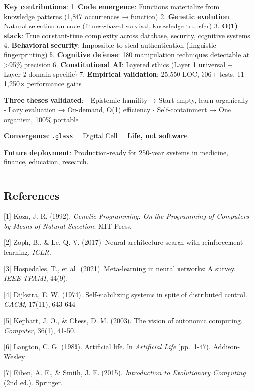 \documentclass[
]{article}
\begin{document}
\textbf{Key contributions}: 1. \textbf{Code emergence}: Functions
materialize from knowledge patterns (1,847 occurrences → function) 2.
\textbf{Genetic evolution}: Natural selection on code (fitness-based
survival, knowledge transfer) 3. \textbf{O(1) stack}: True constant-time
complexity across database, security, cognitive systems 4.
\textbf{Behavioral security}: Impossible-to-steal authentication
(linguistic fingerprinting) 5. \textbf{Cognitive defense}: 180
manipulation techniques detectable at \textgreater95\% precision 6.
\textbf{Constitutional AI}: Layered ethics (Layer 1 universal + Layer 2
domain-specific) 7. \textbf{Empirical validation}: 25,550 LOC, 306+
tests, 11-1,250× performance gains

\textbf{Three theses validated}: - Epistemic humility → Start empty,
learn organically - Lazy evaluation → On-demand, O(1) efficiency -
Self-containment → One organism, 100\% portable

\textbf{Convergence}: \texttt{.glass} = Digital Cell = \textbf{Life, not
software}

\textbf{Future deployment}: Production-ready for 250-year systems in
medicine, finance, education, research.

\begin{center}\rule{0.5\linewidth}{0.5pt}\end{center}

\subsection{References}\label{references}

{[}1{]} Koza, J. R. (1992). \emph{Genetic Programming: On the
Programming of Computers by Means of Natural Selection}. MIT Press.

{[}2{]} Zoph, B., \& Le, Q. V. (2017). Neural architecture search with
reinforcement learning. \emph{ICLR}.

{[}3{]} Hospedales, T., et al.~(2021). Meta-learning in neural networks:
A survey. \emph{IEEE TPAMI}, 44(9).

{[}4{]} Dijkstra, E. W. (1974). Self-stabilizing systems in spite of
distributed control. \emph{CACM}, 17(11), 643-644.

{[}5{]} Kephart, J. O., \& Chess, D. M. (2003). The vision of autonomic
computing. \emph{Computer}, 36(1), 41-50.

{[}6{]} Langton, C. G. (1989). Artificial life. In \emph{Artificial
Life} (pp.~1-47). Addison-Wesley.

{[}7{]} Eiben, A. E., \& Smith, J. E. (2015). \emph{Introduction to
Evolutionary Computing} (2nd ed.). Springer.
\end{document}
